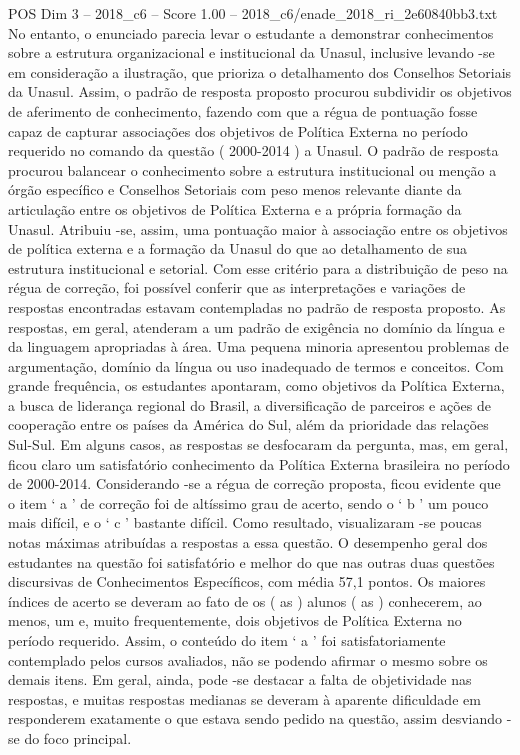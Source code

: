 \begin{textsample}{POS Dim 3 – 2018\_c6 – Score 1.00 – 2018\_c6/enade\_2018\_ri\_2e60840bb3.txt}
No entanto, o enunciado parecia levar o estudante a demonstrar conhecimentos sobre a estrutura organizacional e institucional da Unasul, inclusive levando -se em consideração a ilustração, que prioriza o detalhamento dos Conselhos Setoriais da Unasul.
Assim, o padrão de resposta proposto procurou subdividir os objetivos de aferimento de conhecimento, fazendo com que a régua de pontuação fosse capaz de capturar associações dos objetivos de Política Externa no período requerido no comando da questão ( 2000-2014 ) a Unasul.
O padrão de resposta procurou balancear o conhecimento sobre a estrutura institucional ou menção a órgão específico e Conselhos Setoriais com peso menos relevante diante da articulação entre os objetivos de Política Externa e a própria formação da Unasul.
Atribuiu -se, assim, uma pontuação maior à associação entre os objetivos de política externa e a formação da Unasul do que ao detalhamento de sua estrutura institucional e setorial.
Com esse critério para a distribuição de peso na régua de correção, foi possível conferir que as interpretações e variações de respostas encontradas estavam contempladas no padrão de resposta proposto.
As respostas, em geral, atenderam a um padrão de exigência no domínio da língua e da linguagem apropriadas à área.
Uma pequena minoria apresentou problemas de argumentação, domínio da língua ou uso inadequado de termos e conceitos.
Com grande frequência, os estudantes apontaram, como objetivos da Política Externa, a busca de liderança regional do Brasil, a diversificação de parceiros e ações de cooperação entre os países da América do Sul, além da prioridade das relações Sul-Sul.
Em alguns casos, as respostas se desfocaram da pergunta, mas, em geral, ficou claro um satisfatório conhecimento da Política Externa brasileira no período de 2000-2014.
Considerando -se a régua de correção proposta, ficou evidente que o item ‘ a ’ de correção foi de altíssimo grau de acerto, sendo o ‘ b ’ um pouco mais difícil, e o ‘ c ’ bastante difícil.
Como resultado, visualizaram -se poucas notas máximas atribuídas a respostas a essa questão.
O desempenho geral dos estudantes na questão foi satisfatório e melhor do que nas outras duas questões discursivas de Conhecimentos Específicos, com média 57,1 pontos.
Os maiores índices de acerto se deveram ao fato de os ( as ) alunos ( as ) conhecerem, ao menos, um e, muito frequentemente, dois objetivos de Política Externa no período requerido.
Assim, o conteúdo do item ‘ a ’ foi satisfatoriamente contemplado pelos cursos avaliados, não se podendo afirmar o mesmo sobre os demais itens.
Em geral, ainda, pode -se destacar a falta de objetividade nas respostas, e muitas respostas medianas se deveram à aparente dificuldade em responderem exatamente o que estava sendo pedido na questão, assim desviando -se do foco principal.

\end{textsample}
